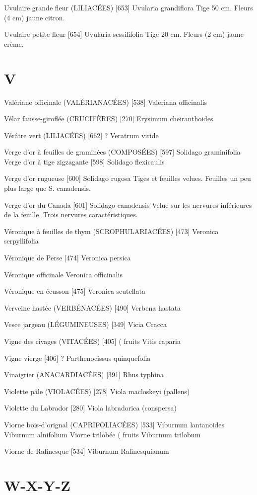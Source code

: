 \documentclass[book,12pt,a4paper,onecolumn,openany]{memoir}
\begin{document}
Uvulaire grande fleur (LILIACÉES)  [653]
				Uvularia grandiflora
Tige 50 cm. Fleurs (4 cm) jaune citron.

Uvulaire petite fleur  [654]
				Uvularia sessilifolia
Tige 20 cm. Fleurs (2 cm) jaune crème.

\chapter*{V}

Valériane officinale (VALÉRIANACÉES)  [538]
				Valeriana officinalis

Vélar fausse-giroflée (CRUCIFÈRES)  [270]
				Erysimum cheiranthoides

Vérâtre vert (LILIACÉES)  [662]						?
				Veratrum viride

Verge d’or à feuilles de graminées (COMPOSÉES)  [597]
				Solidago graminifolia
Verge d’or à tige zigzagante  [598]
				Solidago flexicaulis

Verge d’or rugueuse  [600]
				Solidago rugosa
Tiges et feuilles velues. Feuilles un peu plus large que S. canadensis.

Verge d’or du Canada  [601]
				Solidago canadensis
Velue sur les nervures inférieures de la feuille. Trois nervures caractéristiques.

Véronique à feuilles de thym (SCROPHULARIACÉES)  [473]
				Veronica serpyllifolia

Véronique de Perse  [474]
				Veronica persica

Véronique officinale
				Veronica officinalis

Véronique en écusson  [475]
				Veronica scutellata


Verveine hastée (VERBÉNACÉES)  [490]
				Verbena hastata

Vesce jargeau (LÉGUMINEUSES)  [349]
				Vicia Cracca

Vigne des rivages (VITACÉES)  [405]				( fruits
				Vitis raparia

Vigne vierge  [406]							?
				Parthenocissus quinquefolia

Vinaigrier (ANACARDIACÉES)  [391]
				Rhus typhina

Violette pâle (VIOLACÉES)  [278]
				Viola macloskeyi (pallens)

Violette du Labrador  [280]
				Viola labradorica (conspersa)

Viorne bois-d’orignal (CAPRIFOLIACÉES)  [533]
				Viburnum lantanoides
				Viburnum alnifolium
Viorne trilobée							( fruits
				Viburnum trilobum

Viorne de Rafinesque  [534]
				Viburnum Rafinesquianum

\chapter*{W-X-Y-Z}


	
\end{document}
